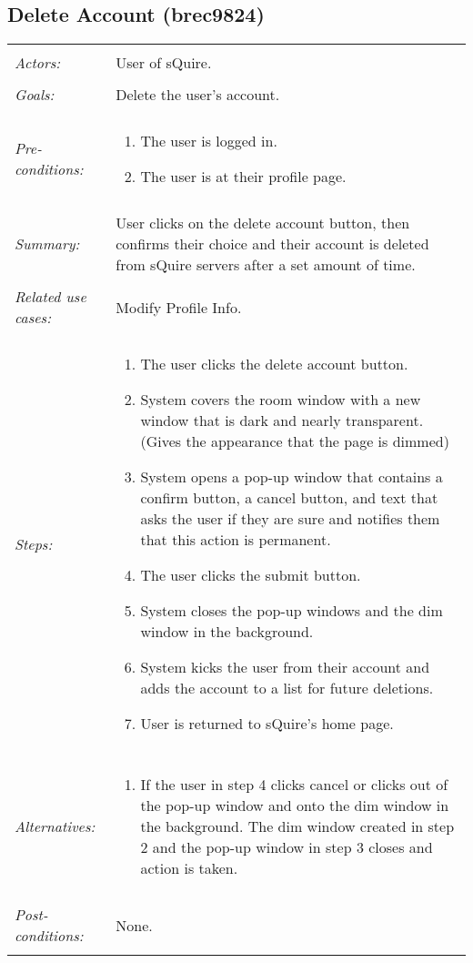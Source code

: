 \documentclass[11pt]{report}
\begin{document}
\subsection{Delete Account (brec9824)}
\begin{tabular}{ p{2cm} p{12cm} }
 \hline
 \\
 \textit{Actors:} & User of sQuire. \\ 
 \\
 \textit{Goals:} & Delete the user's account. \\
 \\
 \textit{Pre-conditions:} & \begin{enumerate}
  \item The user is logged in.
  \item The user is at their profile page.
 \end{enumerate} \\
 \\
 \textit{Summary:} & User clicks on the delete account button, then confirms their choice and their account is deleted from sQuire servers after a set amount of time.\\ 
 \\
 \textit{Related use cases:} & Modify Profile Info. \\ 
 \\
 \textit{Steps:} & \begin{enumerate}
  \item The user clicks the delete account button.
  \item System covers the room window with a new window that is dark and nearly transparent.(Gives the appearance that the page is dimmed) 
  \item System opens a pop-up window that contains a confirm button, a cancel button, and text that asks the user if they are sure and notifies them that this action is permanent.
  \item The user clicks the submit button.
  \item System closes the pop-up windows and the dim window in the background.
  \item System kicks the user from their account and adds the account to a list for future deletions.
  \item User is returned to sQuire's home page.
 \end{enumerate} \\
 \\
 \textit{Alternatives:} & \begin{enumerate} 
  \item If the user in step 4 clicks cancel or clicks out of the pop-up window and onto the dim window in the background. The dim window created in step 2 and the pop-up window in step 3 closes and action is taken.
 \end{enumerate} \\
 \\
 \textit{Post-conditions:} & None. \\
 \\
\hline
\end{tabular}
\end{document}
